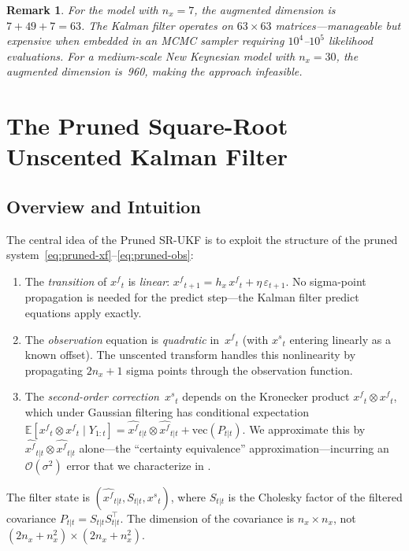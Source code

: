 \documentclass[12pt,a4paper]{article}
\newtheorem{remark}[theorem]{Remark}
\newcommand{\E}{\mathbb{E}}
\newcommand{\vect}{\mathrm{vec}}
\newcommand{\kron}{\otimes}
\newcommand{\xf}{{x^{f}}}
\newcommand{\xs}{{x^{s}}}
\newcommand{\hx}{h_x}
\newcommand{\cO}{\mathcal{O}}
\begin{document}
\begin{remark}
For the \citet{schmitt2003closing} model with $n_x = 7$, the
augmented dimension is $7 + 49 + 7 = 63$. The Kalman filter operates
on $63 \times 63$ matrices---manageable but expensive when embedded
in an MCMC sampler requiring $10^4$--$10^5$ likelihood evaluations.
For a medium-scale New Keynesian model with $n_x = 30$, the augmented
dimension is~960, making the approach infeasible.
\end{remark}


\section{The Pruned Square-Root Unscented Kalman Filter}\label{sec:method}

\subsection{Overview and Intuition}

The central idea of the Pruned SR-UKF is to exploit the structure of
the pruned system~\eqref{eq:pruned-xf}--\eqref{eq:pruned-obs}:
\begin{enumerate}[nosep]
\item The \emph{transition} of $\xf_t$ is \emph{linear}:
$\xf_{t+1} = \hx\,\xf_t + \eta\,\varepsilon_{t+1}$.
No sigma-point propagation is needed for the predict step---the
Kalman filter predict equations apply exactly.
\item The \emph{observation} equation is \emph{quadratic} in~$\xf_t$
(with $\xs_t$ entering linearly as a known offset). The unscented
transform handles this nonlinearity by propagating $2n_x + 1$
sigma points through the observation function.
\item The \emph{second-order correction}~$\xs_t$ depends on the
Kronecker product $\xf_t \kron \xf_t$, which under Gaussian
filtering has conditional expectation
$\E[\xf_t \kron \xf_t \mid Y_{1:t}]
= \hat{\xf}_{t|t} \kron \hat{\xf}_{t|t} + \vect(P_{t|t})$.
We approximate this by $\hat{\xf}_{t|t} \kron \hat{\xf}_{t|t}$
alone---the ``certainty equivalence'' approximation---incurring
an $\cO(\sigma^2)$ error that we characterize in
.
\end{enumerate}
The filter state is $(\hat{\xf}_{t|t}, S_{t|t}, \xs_t)$, where
$S_{t|t}$ is the Cholesky factor of the filtered covariance
$P_{t|t} = S_{t|t} S_{t|t}^\top$. The dimension of the covariance
is $n_x \times n_x$, not $(2n_x + n_x^2) \times (2n_x + n_x^2)$.
\end{document}
